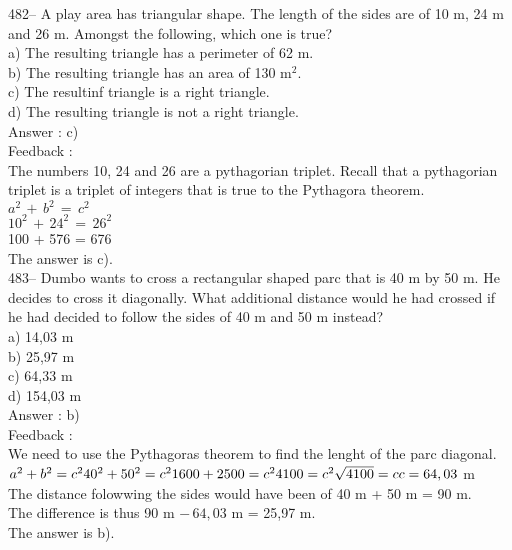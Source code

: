 \documentclass[letterpaper, 12pt]{article}
\begin{document}
482-- A play area has triangular shape. The length of the sides are of 10 m, 24 m and 26 m. Amongst the following, which one is true?\\
a) The resulting triangle has a perimeter of 62 m.\\
b) The resulting triangle has an area of 130 m$^{2}$.\\
c) The resultinf triangle is a right triangle.\\
d) The resulting triangle is not a right triangle.\\

Answer :  c)\\

Feedback : \\
The numbers 10, 24 and 26 are a pythagorian triplet. Recall that a pythagorian triplet is a triplet of integers that is true to the Pythagora theorem.\\
$a^{2}\,+\,b^{2}\,=\,c^{2}$\\
$10^{2}\,+\,24^{2}\,=\,26^{2}$\\
100 + 576 = 676\\
The answer is c).\\

483-- Dumbo wants to cross a rectangular shaped parc that is 40 m by 50 m. He decides to cross it diagonally. What additional distance would he had crossed if he had decided to follow the sides of 40 m and 50 m instead?\\
a) 14,03 m\\
b) 25,97 m\\
c) 64,33 m\\
d) 154,03 m\\


Answer : b)\\

Feedback : \\
We need to use the Pythagoras theorem to find the lenght of the parc diagonal.\\
$a^{2}+b^{2}=c^{2}\\
40^{2}+50^{2}=c^{2}\\
1600+2500=c^{2}\\
4100=c^{2}\\
\sqrt{4100}=c\\
c=64,03$ m\\
The distance folowwing the sides would have been of 40
m + 50 m = 90 m.\\
The difference is thus 90 m $-\,64,03$ m = 25,97 m.\\
The answer is b).\\
\end{document}
